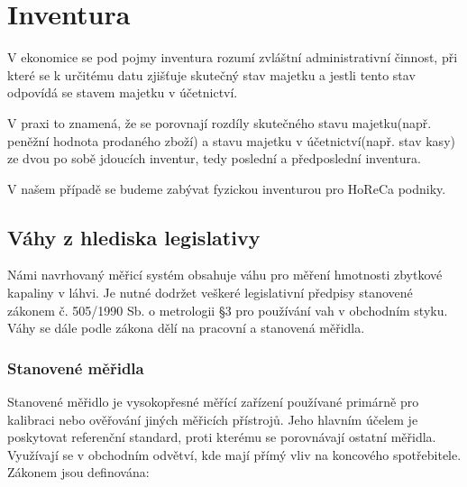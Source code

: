 \chapter{Inventura}
\label{inventura}

V ekonomice se pod pojmy inventura rozumí zvláštní administrativní činnost, při které se k určitému datu zjišťuje skutečný stav majetku a jestli tento stav odpovídá se stavem majetku v účetnictví. 
\cite{Zákon o účetnictví}

V praxi to znamená, že se porovnají rozdíly skutečného stavu majetku(např. peněžní hodnota prodaného zboží) a stavu majetku v účetnictví(např. stav kasy) ze dvou po sobě jdoucích inventur, tedy poslední a předposlední inventura.


V našem případě se budeme zabývat fyzickou inventurou pro HoReCa podniky. %

\section{Váhy z hlediska legislativy}
Námi navrhovaný měřicí systém obsahuje váhu pro měření hmotnosti zbytkové kapaliny v láhvi. Je nutné dodržet veškeré legislativní předpisy stanovené zákonem č. 505/1990 Sb. o metrologii §3 pro používání vah v obchodním styku.
Váhy se dále podle zákona dělí na pracovní a stanovená měřidla. \cite{použití elektronických vah v obchodním styku}

\subsection{Stanovené měřidla}
Stanovené měřidlo je vysokopřesné měřící zařízení používané primárně pro kalibraci nebo ověřování jiných měřicích přístrojů. Jeho hlavním účelem je poskytovat referenční standard, proti kterému se porovnávají ostatní měřidla. Využívají se v obchodním odvětví, kde mají přímý vliv na koncového spotřebitele. Zákonem jsou definována:

